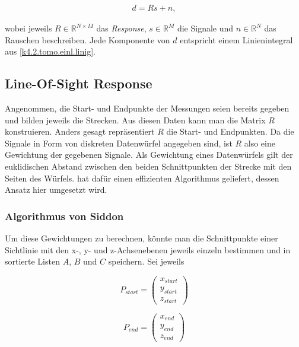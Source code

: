 \documentclass[]{dsadokumentation}
\begin{document}
\begin{equation}
  \begin{aligned}
    d = Rs + n,
  \end{aligned}
\end{equation}

wobei jeweils $R \in \mathbb{R}^{N \times M}$ das \textit{Response}, $s \in \mathbb{R}^M$ die Signale und $n \in \mathbb{R}^N$ das Rauschen beschreiben. Jede Komponente von $d$ entspricht einem Linienintegral aus \cref{k4.2.tomo.einl.linig}.

\subsection{Line-Of-Sight Response}

Angenommen, die Start- und Endpunkte der Messungen seien bereits gegeben und bilden jeweils die Strecken. Aus diesen Daten kann man die Matrix $R$ konstruieren. Anders gesagt repräsentiert $R$ die Start- und Endpunkten. Da die Signale in Form von diskreten Datenwürfel angegeben sind, ist $R$ also eine Gewichtung der gegebenen Signale. Als Gewichtung eines Datenwürfels gilt der euklidischen Abstand zwischen den beiden Schnittpunkten der Strecke mit den Seiten des Würfels. \textcite{k4.2.siddon} hat dafür einen effizienten Algorithmus geliefert, dessen Ansatz hier umgesetzt wird.

\subsubsection{Algorithmus von Siddon}

Um diese Gewichtungen zu berechnen, könnte man die Schnittpunkte einer Sichtlinie mit den x-, y- und z-Achsenebenen jeweils einzeln bestimmen und in sortierte Listen $A$, $B$ und $C$ speichern. Sei jeweils

\begin{equation}
  P_{start} = \begin{pmatrix}x_{start} \\ y_{start} \\ z_{start}\end{pmatrix}
\end{equation}

\begin{equation}
  P_{end} = \begin{pmatrix}x_{end} \\ y_{end} \\ z_{end}\end{pmatrix}
\end{equation}
\end{document}
